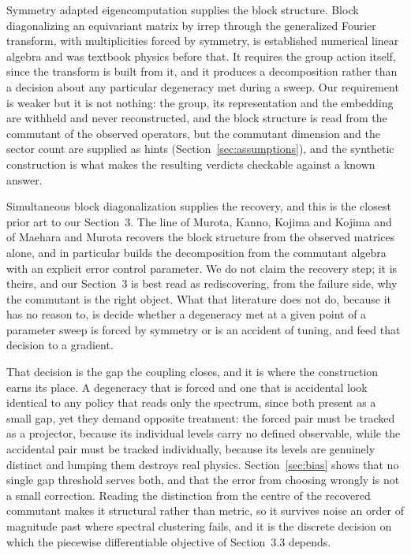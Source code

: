 \documentclass[10pt,a4paper]{amsart}
\begin{document}
Symmetry adapted eigencomputation supplies the block structure. Block
diagonalizing an equivariant matrix by irrep through the generalized Fourier
transform, with multiplicities forced by symmetry, is established numerical
linear algebra \cite{AMK2005,AMK2006} and was textbook physics before that. It
requires the group action itself, since the transform is built from it, and it
produces a decomposition rather than a decision about any particular degeneracy
met during a sweep. Our requirement is weaker but it is not nothing: the group,
its representation and the embedding are withheld and never reconstructed, and
the block structure is read from the commutant of the observed operators, but
the commutant dimension and the sector count are supplied as hints
(Section~\ref{sec:assumptions}), and the synthetic construction is what makes
the resulting verdicts checkable against a known answer.

Simultaneous block diagonalization supplies the recovery, and this is the
closest prior art to our Section~3. The line of Murota, Kanno, Kojima and Kojima
and of Maehara and Murota \cite{MKKK2010,MM2010,MM2011} recovers the block
structure from the observed matrices alone, and \cite{MM2011} in particular
builds the decomposition from the commutant algebra with an explicit error
control parameter. We do not claim the recovery step; it is theirs, and our
Section~3 is best read as rediscovering, from the failure side, why the
commutant is the right object. What that literature does not do, because it has
no reason to, is decide whether a degeneracy met at a given point of a parameter
sweep is forced by symmetry or is an accident of tuning, and feed that decision
to a gradient.

That decision is the gap the coupling closes, and it is where the construction
earns its place. A degeneracy that is forced and one that is accidental look
identical to any policy that reads only the spectrum, since both present as a
small gap, yet they demand opposite treatment: the forced pair must be tracked
as a projector, because its individual levels carry no defined observable, while
the accidental pair must be tracked individually, because its levels are
genuinely distinct and lumping them destroys real physics. Section~\ref{sec:bias}
shows that no single gap threshold serves both, and that the error from choosing
wrongly is not a small correction. Reading the distinction from the centre of
the recovered commutant makes it structural rather than metric, so it survives
noise an order of magnitude past where spectral clustering fails, and it is the
discrete decision on which the piecewise differentiable objective of
Section~3.3 depends.
\end{document}
